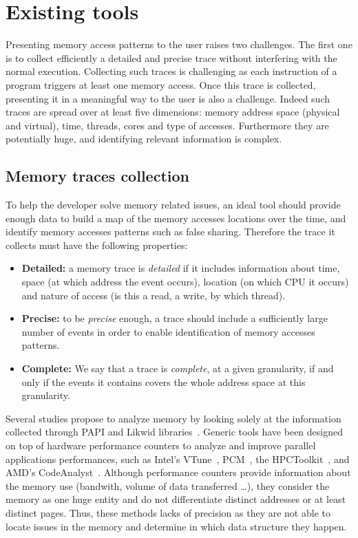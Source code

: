 \section{Existing tools}
\label{sec:mem-tools}

Presenting memory access patterns to the user raises two challenges.
The first one is to collect efficiently a detailed and precise trace without interfering with the normal execution.
Collecting such traces is challenging as each instruction of a program triggers at least one memory access.
Once this trace is collected, presenting it in a meaningful way to the user is also a challenge.
Indeed such traces are spread over at least five dimensions: memory address space (physical and virtual), time, threads, cores and type of accesses.
Furthermore they are potentially huge, and identifying relevant information is complex.

\subsection{Memory traces collection}

To help the developer solve memory related issues, an ideal tool should provide enough data to build a map of the memory accesses locations over the time, and identify memory accesses patterns such as false sharing.
Therefore the trace it collects must have the following properties:
\label{def:traces}
\begin{itemize}
    \item  \textbf{Detailed:}  a memory trace is \emph{detailed} if it includes information about time, space (at which address the event occurs), location (on which CPU it occurs) and nature of access (is this a read, a write, by which thread).
    \item \textbf{Precise:} to be \emph{precise} enough, a trace should include a sufficiently large number of events in order to enable identification of memory accesses patterns.
    \item \textbf{Complete:} We say that a trace is \emph{complete}, at a given granularity, if and only if the events it contains covers the whole address space at this granularity.
\end{itemize}

Several studies propose to analyze memory  by looking solely at the information collected through \gls{PAPI} and \gls{Likwid} libraries~\cite{Majo13(Mis)understanding, Jiang14Understanding,Bosch00Rivet,Weyers14Visualization,Tao01Visualizing,DeRose01Hardware}.
Generic tools have been designed on top of hardware performance counters to analyze and improve parallel applications performances, such as Intel's \gls{VTune}~\cite{Reinders05VTune}, \gls{PCM}~\cite{Wilhalm12Intel}, the \gls{HPCToolkit}~\cite{Adhianto10HPCTOOLKIT}, and AMD's \gls{CodeAnalyst}~\cite{Drongowski08introduction}.
Although performance counters provide information about the memory use (bandwith, volume of data transferred \ldots),  they consider the memory as one huge entity and do not differentiate distinct addresses or at least distinct pages.
Thus, these methods lacks of precision as they are not able to locate issues in the memory and determine in which data structure they happen.

